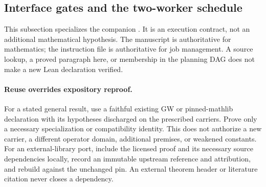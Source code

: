 \documentclass[11pt,a4paper]{article}
\theoremstyle{remark}\newtheorem{remark}[theorem]{Remark}
\begin{document}
\subsection{Interface gates and the two-worker schedule}\label{sec:execution}
This subsection specializes the companion . It is an execution contract, not an additional mathematical hypothesis. The manuscript is authoritative for mathematics; the instruction file is authoritative for job management. A source lookup, a proved paragraph here, or membership in the planning DAG does not make a new Lean declaration verified.

\paragraph{Reuse overrides expository reproof.}
For a stated general result, use a faithful existing GW or pinned-mathlib declaration with its hypotheses discharged on the prescribed carriers. Prove only a necessary specialization or compatibility identity. This does not authorize a new carrier, a different operator domain, additional premises, or weakened constants. For an external-library port, include the licensed proof and its necessary source dependencies locally, record an immutable upstream reference and attribution, and rebuild against the unchanged pin. An external theorem header or literature citation never closes a dependency.
\end{document}
